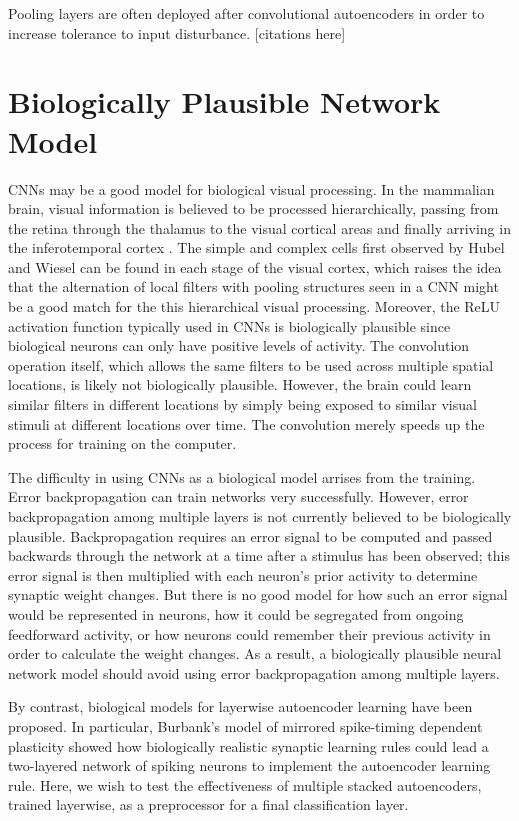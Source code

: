 Pooling layers are often deployed after convolutional autoencoders in order to increase tolerance to input disturbance. [citations here]


\section{Biologically Plausible Network Model}

CNNs may be a good model for biological visual processing. In the mammalian brain, visual information is believed to be processed hierarchically, passing from the retina through the thalamus to the visual cortical areas and finally arriving in the inferotemporal cortex \cite{burbank_understanding_2011}. The simple and complex cells first observed by Hubel and Wiesel can be found in each stage of the visual cortex, which raises the idea that the alternation of local filters with pooling structures seen in a CNN might be a good match for the this hierarchical visual processing. Moreover, the ReLU activation function typically used in CNNs is biologically plausible since biological neurons can only have positive levels of activity. The convolution operation itself, which allows the same filters to be used across multiple spatial locations, is likely not biologically plausible. However, the brain could learn similar filters in different locations by simply being exposed to similar visual stimuli at different locations over time. The convolution merely speeds up the process for training on the computer.


The difficulty in using CNNs as a biological model arrises from the training. Error backpropagation can train networks very successfully. However, error backpropagation among multiple layers is not currently believed to be biologically plausible. Backpropagation requires an error signal to be computed and passed backwards through the network at a time after a stimulus has been observed; this error signal is then multiplied with each neuron's prior activity to determine synaptic weight changes. But there is no good model for how such an error signal would be represented in neurons, how it could be segregated from ongoing feedforward activity, or how neurons could remember their previous activity in order to calculate the weight changes. As a result, a biologically plausible neural network model should avoid using error backpropagation among multiple layers. 

By contrast, biological models for layerwise autoencoder learning have been proposed. In particular, Burbank's model of mirrored spike-timing dependent plasticity \cite{burbank_mirrored_2015} showed how biologically realistic synaptic learning rules could lead a two-layered network of spiking neurons to implement the autoencoder learning rule. Here, we wish to test the effectiveness of multiple stacked autoencoders, trained layerwise, as a preprocessor for a final classification layer.
